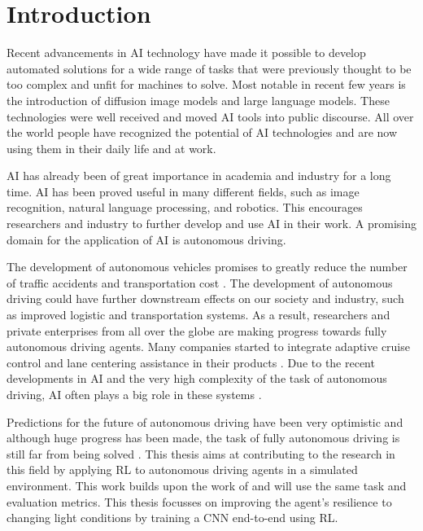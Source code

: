\chapter{Introduction}
\label{cha:Introduction}
\acresetall

Recent advancements in \ac{AI} technology have made it possible to develop automated solutions for a wide range of tasks that were previously thought to be too complex and unfit for machines to solve. Most notable in recent few years is the introduction of diffusion image models and large language models. These technologies were well received and moved \ac{AI} tools into public discourse. All over the world people have recognized the potential of \ac{AI} technologies and are now using them in their daily life and at work.

\ac{AI} has already been of great importance in academia and industry for a long time. AI has been proved useful in many different fields, such as image recognition, natural language processing, and robotics. This encourages researchers and industry to further develop and use AI in their work. A promising domain for the application of AI is autonomous driving.

The development of autonomous vehicles promises to greatly reduce the number of traffic accidents and transportation cost \autocite{mckinsey}. The development of autonomous driving could have further downstream effects on our society and industry, such as improved logistic and transportation systems.
As a result, researchers and private enterprises from all over the globe are making progress towards fully autonomous driving agents. Many companies started to integrate adaptive cruise control and lane centering assistance in their products \autocite{carreviews}. Due to the recent developments in \ac{AI} and the very high complexity of the task of autonomous driving, \ac{AI} often plays a big role in these systems \autocite{drl_for_ad}.

Predictions for the future of autonomous driving have been very optimistic and although huge progress has been made, the task of fully autonomous driving is still far from being solved \autocite{state_of_autonomous_driving2023}. This thesis aims at contributing to the research in this field by applying \ac{RL} to autonomous driving agents in a simulated environment. This work builds upon the work of \textcite{maximilian} and will use the same task and evaluation metrics. This thesis focusses on improving the agent's resilience to changing light conditions by training a \ac{CNN} end-to-end using \ac{RL}.

